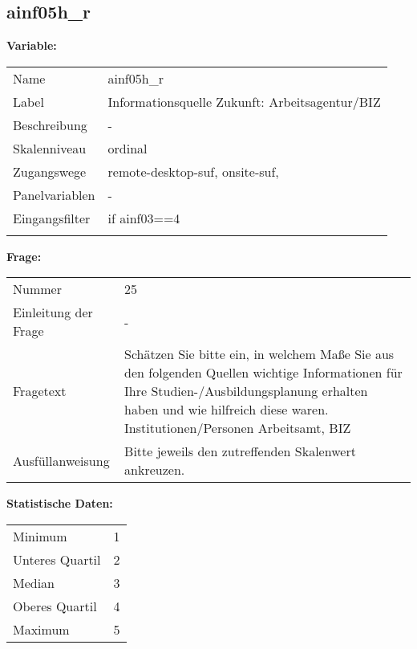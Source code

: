 	
	
	\subsection{ainf05h\_r}
	\label{subSection:ainf05h_r}

	\noindent\textbf{Variable:}\\
		\begin{tabular}{lL{11.3cm}}
			\label{tableVariable:ainf05h_r}
			Name & ainf05h\_r \\
			Label & Informationsquelle Zukunft: Arbeitsagentur/BIZ \\
			Beschreibung & - \\
			Skalenniveau & ordinal \\
			Zugangswege &
				remote-desktop-suf,
				onsite-suf,
 \\
			Panelvariablen & -
			 \\
			Eingangsfilter & if ainf03==4 \\
 \\
		\end{tabular}

		\vspace*{1 cm}
		\noindent\textbf{Frage:}\\
		\begin{tabular}{lL{11.3cm}}
			\label{tableQuestion:ainf05h_r}
			Nummer & 25 \\
			Einleitung der Frage & - \\
			Fragetext & Schätzen Sie bitte ein, in welchem Maße Sie aus den folgenden Quellen wichtige Informationen für Ihre Studien-/Ausbildungsplanung erhalten haben und wie hilfreich diese waren.
Institutionen/Personen
Arbeitsamt, BIZ \\
			Ausfüllanweisung & Bitte jeweils den zutreffenden Skalenwert ankreuzen. \\
		\end{tabular}


		\vspace*{1 cm}
		\noindent\textbf{Statistische Daten:}\\
			\begin{tabular}{ll}
				\label{tableStatistics:ainf05h_r}
					Minimum & 1 \\
					Unteres Quartil & 2 \\
					Median & 3 \\
					Oberes Quartil & 4 \\
					Maximum & 5 \\
			\end{tabular}



